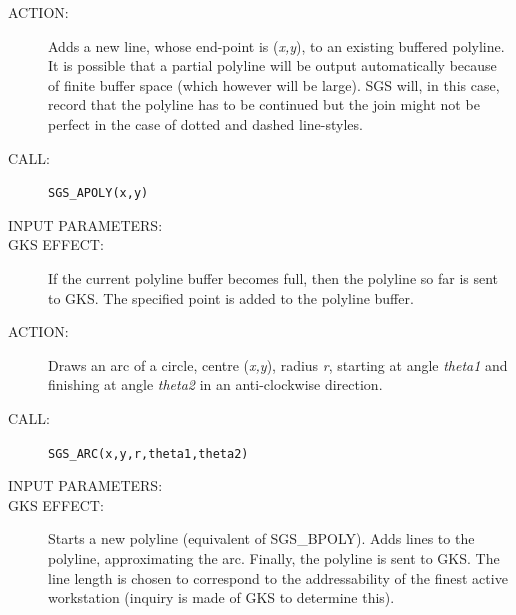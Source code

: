 \documentclass[11pt]{article}
\newcommand{\xlabel}[1]{}
\begin{document}
\begin{htmlonly}
\renewcommand{\rthead}[2]{\subsection{\label{#1}\xlabel{#1}#1 - #2}}
\renewenvironment{params}{\begin{description}}{\end{description}}
\renewcommand{\rparams}[3]{\item{{\em #1}} (#2) #3}
\end{htmlonly}

\begin{description}
\item [ACTION:]
Adds a new line, whose end-point is ({\em x,y}), to an existing buffered
polyline.
It is possible that a partial polyline will be output automatically because of
finite buffer space (which however will be large).
SGS will, in this case, record that the polyline has to be continued but the
join might not be perfect in the case of dotted and dashed line-styles.
\item [CALL:]
{\tt SGS\_APOLY(x,y)}
\item [INPUT PARAMETERS:]
\begin{params}
\end{params}
\item [GKS EFFECT:]
If the current polyline buffer becomes full, then the polyline so far is sent to
GKS.
The specified point is added to the polyline buffer.
\end{description}
\goodbreak

\begin{description}
\item [ACTION:]
Draws an arc of a circle, centre ({\em x,y}), radius {\em r}, starting at
angle {\em theta1}\/ and finishing at angle {\em theta2}\/ in an anti-clockwise
direction.
\item [CALL:]
{\tt SGS\_ARC(x,y,r,theta1,theta2)}
\item [INPUT PARAMETERS:]
\begin{params}
\end{params}
\item [GKS EFFECT:]
Starts a new polyline (equivalent of SGS\_BPOLY).
Adds lines to the polyline, approximating the arc.
Finally, the polyline is sent to GKS.
The line length is chosen to correspond to the addressability of the finest
active workstation (inquiry is made of GKS to determine this).
\end{description}
\goodbreak
\end{document}
